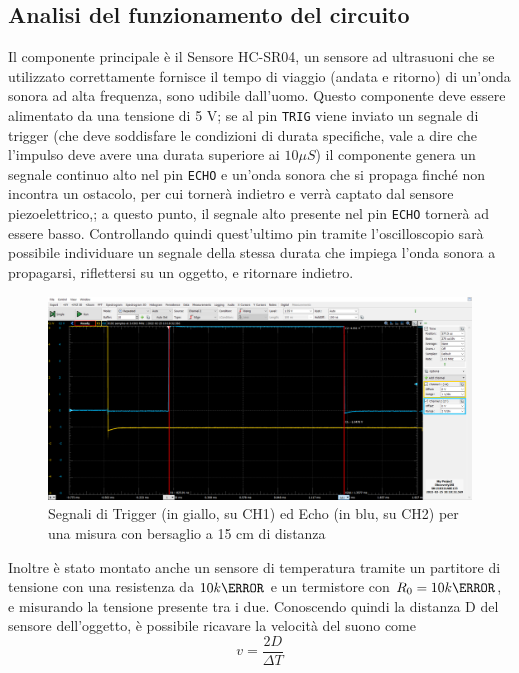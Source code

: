 \documentclass[10pt, a4paper, italian]{article}
\begin{document}
\subsection{Analisi del funzionamento del circuito}
Il componente principale è il Sensore HC-SR04, un sensore ad ultrasuoni che se utilizzato correttamente fornisce il tempo di viaggio (andata e ritorno) di un'onda sonora ad alta frequenza, sono udibile dall'uomo.
Questo componente deve essere alimentato da una tensione di 5 V; se al pin \verb+TRIG+ viene inviato un segnale di trigger (che deve soddisfare le condizioni di durata specifiche, vale a dire che l'impulso deve avere una durata superiore ai $10 \mu S$) il componente genera un segnale continuo alto nel pin \verb+ECHO+ e un'onda sonora che si propaga finché non incontra un ostacolo, per cui tornerà indietro e verrà captato dal sensore piezoelettrico,; a questo punto, il segnale alto presente nel pin \verb+ECHO+ tornerà ad essere basso. Controllando quindi quest'ultimo pin tramite l'oscilloscopio sarà possibile individuare un segnale della stessa durata che impiega l'onda sonora a propagarsi, riflettersi su un oggetto, e ritornare indietro.
\begin{figure}[htbp]
    \centering
	\includegraphics[scale=0.4]{echo}
    \caption{Segnali di Trigger (in giallo, su CH1) ed Echo (in blu, su CH2) per una misura con bersaglio a 15 cm di distanza}
\end{figure}
Inoltre è stato montato anche un sensore di temperatura tramite un partitore di tensione con una resistenza da $10 k\ohm$ e un termistore con $R_0 =10 k\ohm$, e misurando la tensione presente tra i due.
Conoscendo quindi la distanza D del sensore dell'oggetto, è possibile ricavare la velocità del suono come
\begin{equation}
v= \frac{2 D}{\Delta T}
\end{equation}
\end{document}
